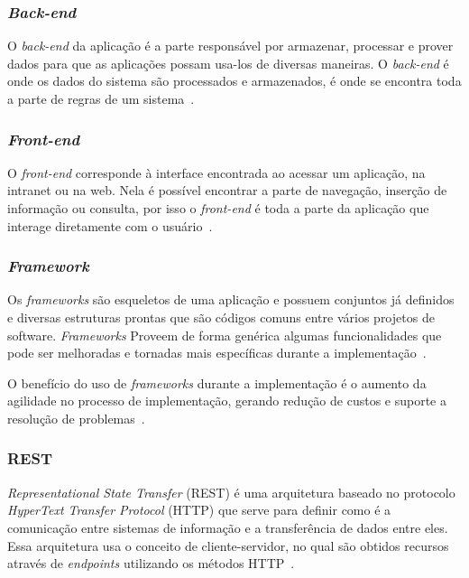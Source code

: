 \subsubsection{\textit{Back-end}}

O \textit{back-end} da aplicação é a parte responsável por armazenar, processar e prover dados para que as aplicações possam usa-los de diversas maneiras.
O \textit{back-end} é onde os dados do sistema são processados e armazenados,
é onde se encontra toda a parte de regras de um sistema~\cite{silva2017aplicaccao}.

\subsubsection{\textit{Front-end}}

O \textit{front-end} corresponde à interface encontrada ao acessar um aplicação, na intranet ou na web.
Nela é possível encontrar a parte de navegação, inserção de informação ou consulta, por isso o \textit{front-end} é toda a parte da aplicação que interage diretamente com o usuário~\cite{de2016estudo}.

\subsubsection{\textit{Framework}}

Os \textit{frameworks} são esqueletos de uma aplicação e possuem conjuntos já definidos e diversas estruturas prontas que são códigos comuns entre vários projetos de software.
\textit{Frameworks} Proveem de forma genérica algumas funcionalidades que pode ser melhoradas e tornadas mais específicas durante a implementação~\cite{minetto2007frameworks}.

O benefício do uso de \textit{frameworks} durante a implementação é o aumento da agilidade no processo de implementação, gerando redução de custos e suporte a resolução de problemas~\cite{nash2003java}.

\subsubsection{REST}
 \textit{Representational State Transfer} (REST) é uma arquitetura baseado no protocolo \textit{HyperText Transfer Protocol} (HTTP) que serve para definir como é a comunicação entre sistemas de informação e a transferência de dados entre eles.
Essa arquitetura usa o conceito de cliente-servidor, no qual são obtidos recursos através de \textit{endpoints} utilizando os métodos HTTP~\cite{pacheco2018institutos}.

